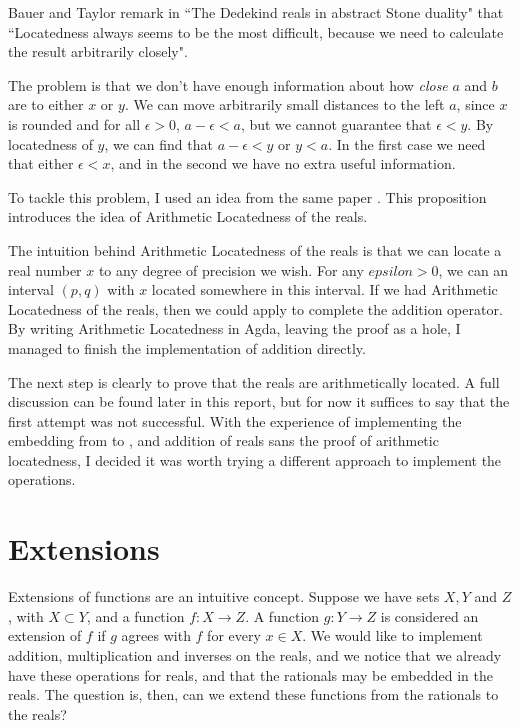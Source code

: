 \documentclass[ProjectReport]{subfiles}
\begin{document}
Bauer and Taylor remark in ``The Dedekind reals in abstract Stone duality" \cite[Remark 11.14]{bauer_taylor_2009} that ``Locatedness always seems to be the most difficult, because we need to calculate the result arbitrarily closely". 

The problem is that we don't have enough information about how \textit{close} $a$ and $b$ are to either $x$ or $y$. We can move arbitrarily small distances to the left $a$, since $x$ is rounded and for all $\epsilon > 0$, $a - \epsilon < a$, but we cannot guarantee that $\epsilon < y$. By locatedness of $y$, we can find that $a - \epsilon < y$ or $y < a$. In the first case we need that either $\epsilon < x$, and in the second we have no extra useful information. 

To tackle this problem, I used an idea from the same paper \cite[Proposition 11.15]{bauer_taylor_2009}. This proposition introduces the idea of Arithmetic Locatedness of the reals.


The intuition behind Arithmetic Locatedness of the reals is that we can locate a real number $x$ to any degree of precision we wish. For any $epsilon > 0$, we can an interval $(p , q)$ with $x$ located somewhere in this interval. If we had Arithmetic Locatedness of the reals, then we could apply \cite[Lemma 11.16]{bauer_taylor_2009} to complete the addition operator. By writing Arithmetic Locatedness in Agda, leaving the proof as a hole, I managed to finish the implementation of addition directly.


The next step is clearly to prove that the reals are arithmetically located. A full discussion can be found later in this report, but for now it suffices to say that the first attempt was not successful. With the experience of implementing the embedding from  to , and addition of reals sans the proof of arithmetic locatedness, I decided it was worth trying a different approach to implement the operations.

\section{Extensions}

Extensions of functions are an intuitive concept. Suppose we have sets $X, Y$ and $Z$, with $X \subset Y$, and a function $f : X \to Z$. A function $g : Y \to Z$ is considered an extension of $f$ if $g$ agrees with $f$ for every $x \in X$. We would like to implement addition, multiplication and inverses on the reals, and we notice that we already have these operations for reals, and that the rationals may be embedded in the reals. The question is, then, can we extend these functions from the rationals to the reals?
\end{document}
